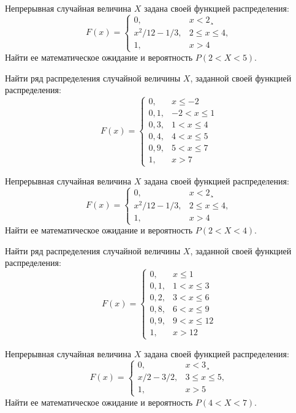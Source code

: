 \vfill

\z Непрерывная случайная величина $X$ задана своей функцией распределения: $$ F(x) = \begin{cases}0, & x < 2¸\\ x^2/12-1/3, & 2 \leqslant x \leqslant 4, \\ 1, & x > 4 \end{cases} $$ Найти ее математическое ожидание и вероятность $P(2 < X < 5)$.
 

\vfill

\newpage\setcounter{zad}{0}

\z Найти ряд распределения случайной величины $X$, заданной своей функцией распределения: $$ F(x) = \begin{cases}0, & x \leqslant -2 \\ 0{,}1, & -2 < x \leqslant 1 \\ 0{,}3, & 1 < x \leqslant 4 \\ 0{,}4, & 4 < x \leqslant 5 \\ 0{,}9, & 5 < x \leqslant 7 \\ 1, & x > 7 \end{cases} $$


\vfill

\z Непрерывная случайная величина $X$ задана своей функцией распределения: $$ F(x) = \begin{cases}0, & x < 2¸\\ x^2/12-1/3, & 2 \leqslant x \leqslant 4, \\ 1, & x > 4 \end{cases} $$ Найти ее математическое ожидание и вероятность $P(2 < X < 4)$.
 

\vfill

\newpage\setcounter{zad}{0}

\z Найти ряд распределения случайной величины $X$, заданной своей функцией распределения: $$ F(x) = \begin{cases}0, & x \leqslant 1 \\ 0{,}1, & 1 < x \leqslant 3 \\ 0{,}2, & 3 < x \leqslant 6 \\ 0{,}8, & 6 < x \leqslant 9 \\ 0{,}9, & 9 < x \leqslant 12 \\ 1, & x > 12 \end{cases} $$


\vfill

\z Непрерывная случайная величина $X$ задана своей функцией распределения: $$ F(x) = \begin{cases}0, & x < 3¸\\ x/2-3/2, & 3 \leqslant x \leqslant 5, \\ 1, & x > 5 \end{cases} $$ Найти ее математическое ожидание и вероятность $P(4 < X < 7)$.
 

